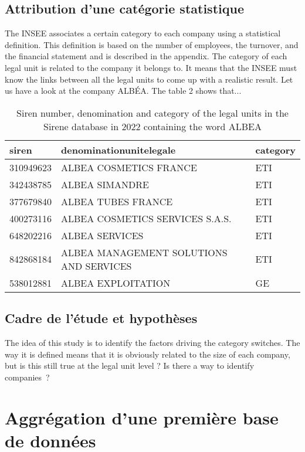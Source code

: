 \documentclass[AEJ]{AEA}
\begin{document}
\subsection{Attribution d'une catégorie statistique}
The INSEE associates a certain category to each company using a statistical definition.
This definition is based on the number of employees, the turnover, and the financial statement
and is described in the appendix. The category of each legal unit is related to the company it belongs to.
It means that the INSEE must know the links between all the legal units to come up with a
realistic result. Let us have a look at the company ALBÉA. The table 2 shows that... 
\newline
\begin{table}
    \begin{tabular}{l|l|l}
        \hline
        siren & denominationunitelegale & category \\
        \hline
        310949623 & ALBEA COSMETICS FRANCE & ETI \\
        \hline
        342438785 & ALBEA SIMANDRE & ETI \\
        \hline
        377679840 & ALBEA TUBES FRANCE & ETI \\
        \hline
        400273116 & ALBEA COSMETICS SERVICES S.A.S. & ETI \\
        \hline
        648202216 & ALBEA SERVICES & ETI \\
        \hline
        842868184 & ALBEA MANAGEMENT SOLUTIONS AND SERVICES & ETI \\
        \hline
        538012881 & ALBEA EXPLOITATION & GE \\
        \hline
    \end{tabular}
    \caption{Siren number, denomination and category of the legal units in the Sirene database in 2022 containing the word ALBEA}
\end{table}
\subsection{Cadre de l'étude et hypothèses}
The idea of this study is to identify the factors driving the category switches.
The way it is defined means that it is obviously related to the size of each company,
but is this still true at the legal unit level ? Is there a way to identify companies~?
\section{Aggrégation d'une première base de données}
\end{document}
